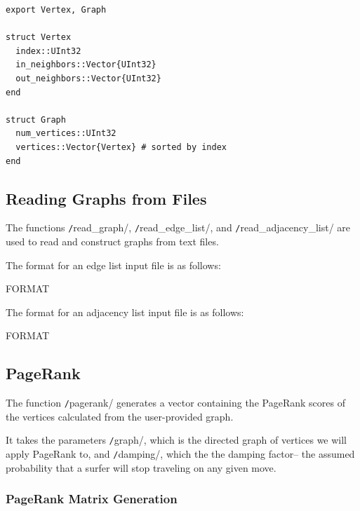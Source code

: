\documentclass[12pt, titlepage, twoside]{amsart}
\begin{document}
\begin{verbatim}
export Vertex, Graph

struct Vertex
  index::UInt32
  in_neighbors::Vector{UInt32}
  out_neighbors::Vector{UInt32}
end

struct Graph
  num_vertices::UInt32
  vertices::Vector{Vertex} # sorted by index
end
\end{verbatim}

\subsection{Reading Graphs from Files}

The functions \texttt/read_graph/, \texttt/read_edge_list/, and \texttt/read_adjacency_list/ are used to read and construct graphs from text files.

The format for an edge list input file is as follows:

FORMAT


The format for an adjacency list input file is as follows:

FORMAT


\subsection{PageRank}

The function \texttt/pagerank/ generates a vector containing the PageRank scores of the
vertices calculated from the user-provided graph.

It takes the parameters \texttt/graph/,
which is the directed graph of vertices we will apply PageRank to,
and \texttt/damping/, which the the damping factor-- the assumed probability that a surfer will stop traveling on any given move.

\subsubsection{PageRank Matrix Generation}
\end{document}
